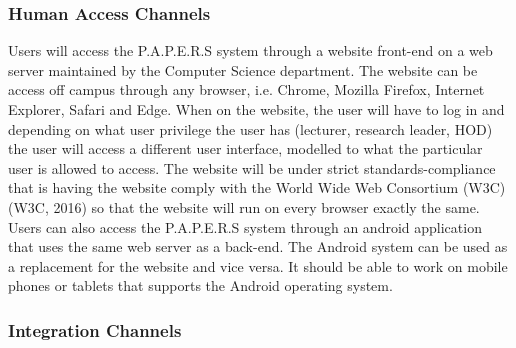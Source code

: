 \documentclass{article}
\begin{document}
		\subsubsection{Human Access Channels}
			Users will access the P.A.P.E.R.S system through a website front-end on a web server maintained by the Computer Science department. The website can be access off campus through any browser, i.e. Chrome, Mozilla Firefox, Internet Explorer, Safari and Edge. When on the website, the user will have to log in and depending on what user privilege the user has (lecturer, research leader, HOD) the user will access a different user interface, modelled to what the particular user is allowed to access. The website will be under strict standards-compliance that is having the website comply with the World Wide Web Consortium (W3C) (W3C, 2016) so that the website will run on every browser exactly the same. Users can also access the P.A.P.E.R.S system through an android application that uses the same web server as a back-end. The Android system can be used as a replacement for the website and vice versa. It should be able to work on mobile phones or tablets that supports the Android operating system.
		\subsubsection{Integration Channels}
\end{document}
